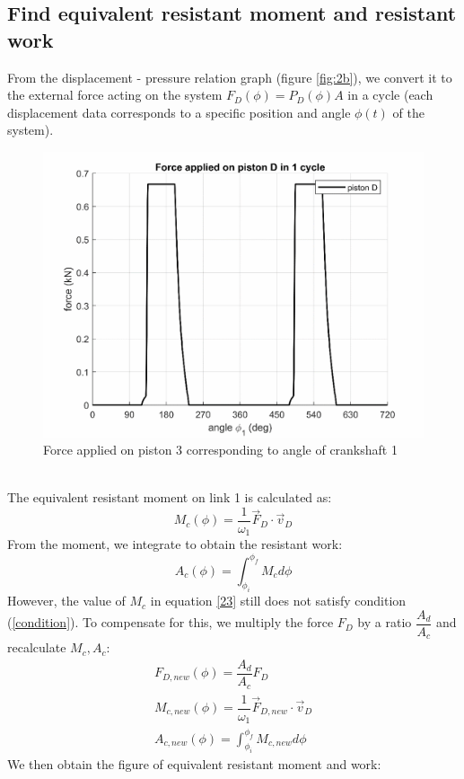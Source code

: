 \subsection{Find equivalent resistant moment and resistant work}
From the displacement - pressure  relation graph (figure \ref{fig:2b}), we convert it to the external force acting on the system $ F_D(\phi)=P_D(\phi) A $ in a cycle (each displacement data corresponds to a specific position and angle $ \phi(t) $ of the system).
\begin{figure}[h]
	\centering
	\includegraphics[width=0.6\linewidth]{15}
	\caption{Force applied on piston 3 corresponding to angle of crankshaft 1}
	\label{fig:15}
\end{figure}\\
The equivalent resistant moment on link 1 is calculated as:
\begin{equation}\label{23}
M_c(\phi)=\dfrac{1}{\omega_1}\vec{F}_D\cdot\vec{v}_D
\end{equation}
From the moment, we integrate to obtain the resistant work:
\begin{equation}\label{24}
A_c(\phi)=\int_{\phi_i}^{\phi_f}M_c d\phi
\end{equation}
However, the value of $ M_c $ in equation \ref{23} still does not satisfy condition (\ref{condition}). To compensate for this, we multiply the force $ F_D $ by a ratio $ \dfrac{A_d}{A_c} $ and recalculate $ M_c, A_c $:
\begin{equation}
\begin{array}{l}
F_{D,new}(\phi)=\dfrac{A_d}{A_c}F_D\\
M_{c,new}(\phi)=\dfrac{1}{\omega_1}\vec{F}_{D,new}\cdot\vec{v}_D\\
\displaystyle A_{c,new}(\phi)=\int_{\phi_i}^{\phi_f}M_{c,new} d\phi
\end{array}
\end{equation}\clearpage
We then obtain the figure of equivalent resistant moment and work:
